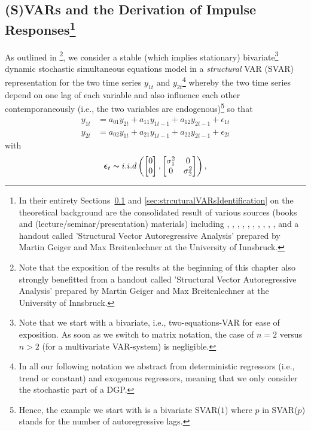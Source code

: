\documentclass[a4paper,11pt,listof=nochaptergap,oneside,pointednumbers,bibtotoc,bigheadings,liststotoc,hidelinks]{scrbook}
\theoremstyle{mysatz}
\theoremstyle{mydefinition}
\theoremstyle{mytheorem}
\theoremstyle{mybemerkung}
\newcommand{\vect}[1]{\boldsymbol{\mathbf{#1}}}
\begin{document}
\subsection[(S)VARs and the Derivation of Impulse Responses]{(S)VARs and the Derivation of Impulse Responses\footnote{In their entirety Sections~\ref{sec:SVARsDerviationIRFs} and \ref{sec:strcuturalVARsIdentification} on the theoretical background are the consolidated result of various sources (books and (lecture/seminar/presentation) materials) including \citet{lutkepohlkilian:17}, \citet{lutkepohl:05}, \citet{stockwatson:01}, \citet{hamilton:94}, \citet{villaramirez:10}, \citet{kunst:07}, \citet{whelan:16}, \citet{zivot:00}, \citet{cesa:07}, \citet{foroni:14}, \citet{rossi:11} and a handout called 'Structural Vector Autoregressive Analysis' prepared by Martin Geiger and Max Breitenlechner at the University of Innsbruck.}}
\label{sec:SVARsDerviationIRFs}
As outlined in \citet{zivot:00}\footnote{Note that the exposition of the results at the beginning of this chapter also strongly benefitted from a handout called 'Structural Vector Autoregressive Analysis' prepared by Martin Geiger and Max Breitenlechner at the University of Innsbruck. }, we consider a stable (which implies stationary) bivariate\footnote{Note that we start with a bivariate, i.e., two-equations-VAR for ease of exposition. As soon as we switch to matrix notation, the case of $n=2$ versus $n>2$ (for a multivariate VAR-system) is negligible.} dynamic stochastic simultaneous equations model in a \textit{structural} VAR (SVAR) representation for the two time series $y_{1t}$ and $y_{2t}$\footnote{In all our following notation we abstract from deterministic regressors (i.e., trend or constant) and exogenous regressors, meaning that we only consider the stochastic part of a DGP.} whereby the two time series depend on one lag of each variable and also influence each other contemporaneously (i.e., the two variables are endogenous)\footnote{Hence, the example we start with is a bivariate SVAR($1$) where $p$ in SVAR($p$) stands for the number of autoregressive lags.} so that
\begin{equation} \label{eq:svar1}
\begin{split}
	y_{1t} & = a_{01}y_{2t} + a_{11}y_{1t-1} + a_{12}y_{2t-1} + \epsilon_{1t} \\
	y_{2t} & = a_{02}y_{1t} + a_{21}y_{1t-1} + a_{22}y_{2t-1} + \epsilon_{2t}
\end{split}								
\end{equation}
with 
\begin{equation}
\begin{split}
	\vect{\epsilon}_t \thicksim i.i.d \left (  \begin{bmatrix}
    							0 \\
    							0
 							 \end{bmatrix}, \begin{bmatrix}
    							\sigma_{1}^2 & 0  \\
    							0 & \sigma_{2}^2
 							 \end{bmatrix} \right ),
\end{split}								
\end{equation}
\end{document}

